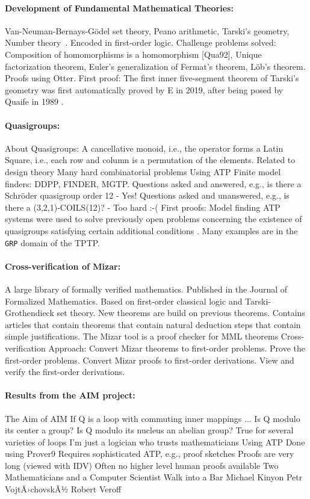 \documentclass[runningheads]{llncs}
\begin{document}
\paragraph{Development of Fundamental Mathematical Theories:}
Van-Neuman-Bernays-Gödel set theory\cite{Qua92-JAR},
Peano arithmetic,
Tarski's geometry,
Number theory~\cite{Qua92-Book}.
Encoded in first-order logic.
Challenge problems solved:
Composition of homomorphisms is a homomorphism [Qua92],
Unique factorization theorem,
Euler's generalization of Fermat's theorem,
Löb's theorem.
Proofs using Otter.
First proof: 
The first inner five-segment theorem of Tarski's geometry \cite{SST83} was first
automatically proved by E \cite{Sch13-LPAR} in 2019, after being posed by Quaife in
1989 \cite{Qua89}.

\paragraph{Quasigroups:}
About Quasigroups: A cancellative monoid, i.e., the operator forms a Latin Square, 
i.e., each row and column is a permutation of the elements.
Related to design theory
Many hard combinatorial problems
Using ATP
Finite model finders: DDPP, FINDER, MGTP.
Questions asked and answered, e.g.,
is there a Schröder quasigroup order 12 - Yes!
Questions asked and unanswered, e.g.,
is there a (3,2,1)-COILS(12)? - Too hard :-(
First proofs: Model finding ATP systems were used to solve previously open problems concerning the
existence of quasigroups satisfying certain additional conditions \cite{SFS95}.
Many examples are in the {\tt GRP} domain of the TPTP.

\paragraph{Cross-verification of Mizar:}
A large library of formally verified mathematics.
Published in the Journal of Formalized Mathematics.
Based on first-order classical logic and Tarski-Grothendieck set theory.
New theorems are build on previous theorems.
Contains articles that contain theorems that contain natural deduction steps that 
contain simple justifications.
The Mizar tool is a proof checker for MML theorems
Cross-verification Approach:
Convert Mizar theorems to first-order problems.
Prove the first-order problems.
Convert Mizar proofs to first-order derivations.
View and verify the first-order derivations.

\paragraph{Results from the AIM project:}
The Aim of AIM
If Q is a loop with commuting inner mappings ...
Is Q modulo its center a group?
Is Q modulo its nucleus an abelian group?
True for several varieties of loops
I'm just a logician who trusts mathematicians
Using ATP
Done using Prover9
Requires sophisticated ATP, e.g., proof sketches
Proofs are very long (viewed with IDV)
Often no higher level human proofs available
Two Mathematicians and a Computer Scientist Walk into a Bar
Michael Kinyon
Petr VojtÄ›chovskÃ½
Robert Veroff
\end{document}

